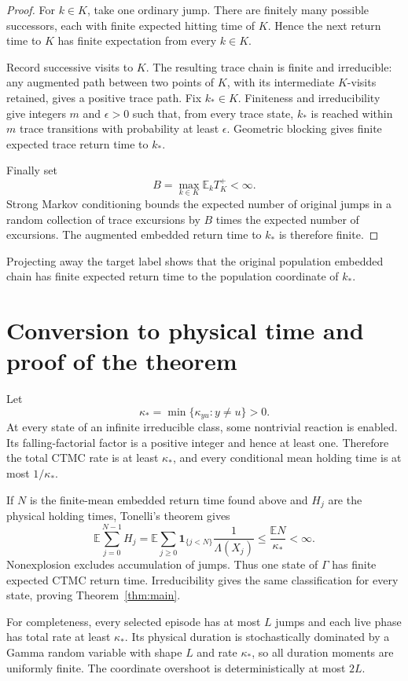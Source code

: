 \documentclass[11pt]{article}
\theoremstyle{definition}
\newcommand{\Gamm}{\Gamma}
\newcommand{\E}{\mathbb E}
\newcommand{\one}{\mathbf 1}
\begin{document}
\begin{proof}
For \(k\in K\), take one ordinary jump.  There are finitely many possible
successors, each with finite expected hitting time of \(K\).  Hence the next
return time to \(K\) has finite expectation from every \(k\in K\).

Record successive visits to \(K\).  The resulting trace chain is finite and
irreducible: any augmented path between two points of \(K\), with its
intermediate \(K\)-visits retained, gives a positive trace path.  Fix
\(k_*\in K\).  Finiteness and irreducibility give integers \(m\) and
\(\epsilon>0\) such that, from every trace state, \(k_*\) is reached within
\(m\) trace transitions with probability at least \(\epsilon\).  Geometric
blocking gives finite expected trace return time to \(k_*\).

Finally set
\[
  B=\max_{k\in K}\E_k T_K^+<\infty.
\]
Strong Markov conditioning bounds the expected number of original jumps in a
random collection of trace excursions by \(B\) times the expected number of
excursions.  The augmented embedded return time to \(k_*\) is therefore
finite.
\end{proof}

Projecting away the target label shows that the original population embedded
chain has finite expected return time to the population coordinate of
\(k_*\).

\section{Conversion to physical time and proof of the theorem}

Let
\[
  \kappa_*=
  \min\{\kappa_{yu}:y\ne u\}>0.
\]
At every state of an infinite irreducible class, some nontrivial reaction is
enabled.  Its falling-factorial factor is a positive integer and hence at
least one.  Therefore the total CTMC rate is at least \(\kappa_*\), and every
conditional mean holding time is at most \(1/\kappa_*\).

If \(N\) is the finite-mean embedded return time found above and \(H_j\) are
the physical holding times, Tonelli's theorem gives
\[
  \E\sum_{j=0}^{N-1}H_j
  =\E\sum_{j\geq0}\one_{\{j<N\}}
      \frac{1}{\Lambda(X_j)}
  \leq \frac{\E N}{\kappa_*}<\infty.
\]
Nonexplosion excludes accumulation of jumps.  Thus one state of \(\Gamm\)
has finite expected CTMC return time.  Irreducibility gives the same
classification for every state, proving Theorem~\ref{thm:main}.

For completeness, every selected episode has at most \(L\) jumps and each
live phase has total rate at least \(\kappa_*\).  Its physical duration is
stochastically dominated by a Gamma random variable with shape \(L\) and
rate \(\kappa_*\), so all duration moments are uniformly finite.  The
coordinate overshoot is deterministically at most \(2L\).
\end{document}
